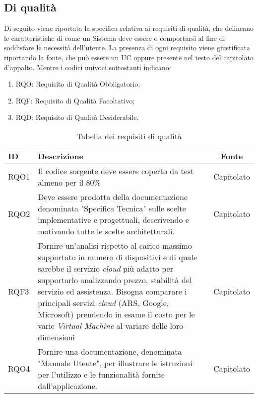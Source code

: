 \subsection{Di qualità}

Di seguito viene riportata la specifica relativa ai requisiti di qualità, che delineano le caratteristiche di come un Sistema
deve essere o comportarsi al fine di soddisfare le necessità dell'utente.
La presenza di ogni requisito viene giustificata riportando la fonte, che può essere un UC oppure presente
nel testo del capitolato d'appalto. Mentre i codici univoci sottostanti indicano:
\begin{enumerate}
	\item RQO: Requisito di Qualità Obbligatorio;
	\item RQF: Requisito di Qualità Facoltativo;
	\item RQD: Requisito di Qualità Desiderabile.
\end{enumerate}

\begin{table}[H]
	\renewcommand{\arraystretch}{1.5}
	\centering
	\begin{tabularx}{\textwidth}{l|X|c}
		\textbf{ID} & \textbf{Descrizione}                                                                                                                                                                                                 & \textbf{Fonte} \\
		\hline
		RQO1        & Il codice sorgente deve essere coperto da test almeno per il 80\%                                                                                                                                                    & Capitolato     \\
		\hline
		RQO2        & Deve essere prodotta della documentazione denominata "Specifica Tecnica" sulle scelte implementative e progettuali, descrivendo e motivando tutte le scelte architetturali.                                                  & Capitolato     \\
		\hline
		RQF3        & Fornire un'analisi rispetto al carico massimo supportato in numero di dispositivi e di quale sarebbe il servizio \textit{cloud} più adatto per supportarlo analizzando prezzo, stabilità del servizio ed assistenza. 
		Bisogna comparare i principali servizi \textit{cloud} (ARS, Google, Microsoft) prendendo in esame il costo per le varie \textit{Virtual Machine} al variare delle loro dimensioni & Capitolato     \\
		\hline
		RQO4        & Fornire una documentazione, denominata "Manuale Utente", per illustrare le istruzioni per l'utilizzo e le funzionalità fornite dall'applicazione. 																									& Capitolato     \\
		\hline
	\end{tabularx}
	\caption{Tabella dei requisiti di qualità}
\end{table}
\newpage
